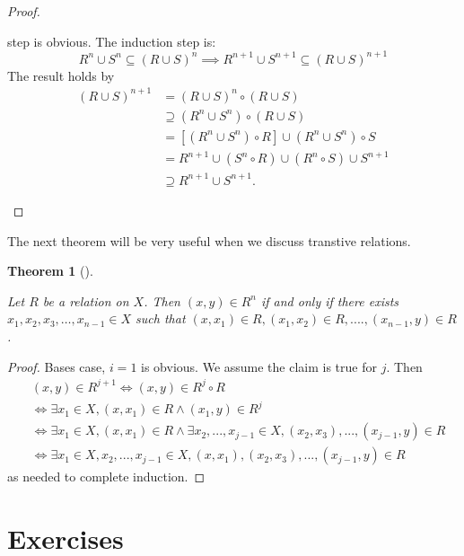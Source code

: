 \documentclass[
  letterpaper,
  10pt,
  reqno,
  twopage,
  openany]{book}
\theoremstyle{plain}
\theoremstyle{definition}
\theoremstyle{definition}
\theoremstyle{definition}
\theoremstyle{plain}
\theoremstyle{plain}
\newtheorem{theorem}{Theorem}[chapter]
\theoremstyle{remark}
\begin{document}
\begin{proof}
\begin{enumerate}
  step is obvious. The induction step is: \[
  R^n \cup S^n\subseteq (R\cup S)^n \implies R^{n+1} \cup S^{n+1}\subseteq (R\cup S)^{n+1}
  \] The result holds by \begin{align*}
  (R\cup S)^{n+1} & =(R\cup S)^n\circ (R\cup S)  \\
  & \supseteq (R^n\cup S^n) \circ (R \cup S) \\
  & = [(R^n\cup S^n)\circ R] \cup (R^n\cup S^n) \circ S \\
  & = R^{n+1} \cup (S^n \circ R) \cup (R^n\circ S) \cup S^{n+1}  \\
  & \supseteq R^{n+1}\cup S^{n+1}.
  \end{align*}
\end{enumerate}

\end{proof}

The next theorem will be very useful when we discuss transtive
relations.

\leavevmode{}%
\begin{theorem}[]\label{thm-powers}

Let \(R\) be a relation on \(X\). Then \((x,y)\in R^n\) if and only if
there exists \(x_1, x_2, x_3, \ldots, x_{n-1}\in X\) such that
\((x,x_1)\in R, (x_1,x_2)\in R , ...., (x_{n-1},y)\in R\).

\end{theorem}

\begin{proof}

Bases case, \(i=1\) is obvious. We assume the claim is true for \(j\).
Then \begin{align*}
& (x,y)\in R^{j+1} \Longleftrightarrow (x,y)\in R^j\circ R \\
& \Longleftrightarrow \exists x_1\in X, (x,x_1)\in R \land (x_1,y)\in R^j \\
& \Longleftrightarrow \exists x_1\in X, (x,x_1)\in R \land \exists x_2, ..., x_{j-1}\in X, (x_2, x_3), ..., (x_{j-1},y)\in R \\
& \Longleftrightarrow  \exists x_1\in X, x_2, ..., x_{j-1}\in X, (x,x_1), (x_2, x_3), ..., (x_{j-1},y)\in R 
\end{align*} as needed to complete induction.

\end{proof}

\hypertarget{exercises-4}{%
\section{Exercises}\label{exercises-4}}
\end{document}
